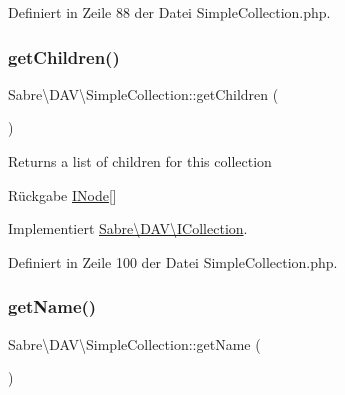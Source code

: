 Definiert in Zeile 88 der Datei Simple\+Collection.\+php.

\mbox{\label{class_sabre_1_1_d_a_v_1_1_simple_collection_abd14f5c14daf0ab6cb480c9894b25f16}} 
\subsubsection{\texorpdfstring{get\+Children()}{getChildren()}}
{\footnotesize\ttfamily Sabre\textbackslash{}\+D\+A\+V\textbackslash{}\+Simple\+Collection\+::get\+Children (\begin{DoxyParamCaption}{ }\end{DoxyParamCaption})}

Returns a list of children for this collection

\begin{DoxyReturn}{Rückgabe}
\mbox{\hyperlink{interface_sabre_1_1_d_a_v_1_1_i_node}{I\+Node}}\mbox{[}\mbox{]} 
\end{DoxyReturn}


Implementiert \mbox{\hyperlink{interface_sabre_1_1_d_a_v_1_1_i_collection_a5344a6890e49fd7a81bb0e38b4c6d0be}{Sabre\textbackslash{}\+D\+A\+V\textbackslash{}\+I\+Collection}}.



Definiert in Zeile 100 der Datei Simple\+Collection.\+php.

\mbox{\label{class_sabre_1_1_d_a_v_1_1_simple_collection_ae558cd8d61b0c9d927e7fe7b77c761d7}} 
\subsubsection{\texorpdfstring{get\+Name()}{getName()}}
{\footnotesize\ttfamily Sabre\textbackslash{}\+D\+A\+V\textbackslash{}\+Simple\+Collection\+::get\+Name (\begin{DoxyParamCaption}{ }\end{DoxyParamCaption})}

